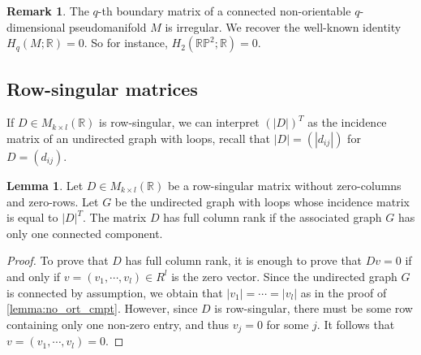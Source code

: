 \documentclass{article}
\theoremstyle{definition}
\newtheorem{remark}[theorem]{Remark}
\newtheorem{lemma}[theorem]{Lemma}
\begin{document}
\begin{remark}
    The $q$-th boundary matrix of a connected non-orientable $q$-dimensional pseudomanifold $M$ is irregular. We recover the well-known identity $H_q(M; \mathbb{R}) = 0$. So for instance, $H_2(\mathbb{RP}^2;\mathbb{R}) = 0.$
\end{remark}

\subsection{Row-singular matrices}\label{subsec:singular_mtx}
If $D \in M_{k \times l}(\mathbb{R})$ is row-singular, 
we can interpret $(|D|)^T$ as the incidence matrix of an undirected graph with loops,
recall that $|D|=(|d_{ij}|)$ for $D=(d_{ij})$.










\begin{lemma}\label{lemma:sig_cmpt}
Let $D\in M_{k\times l}(\mathbb{R})$ be a row-singular matrix without zero-columns and zero-rows.
Let $G$ be the undirected graph with loops whose incidence matrix is equal to $|D|^T$.
The matrix $D$ has full column rank if the associated graph $G$ has only one connected component.
\end{lemma}

\begin{proof}
To prove that $D$ has full column rank,
it is enough to prove that $Dv=0$ if and only if $v=(v_1,\cdots, v_l)\in R^l$ is the zero vector.
Since the undirected graph $G$ is connected by assumption,
we obtain that 
 $|v_1|=\cdots=|v_l|$ as in the proof of \cref{lemma:no_ort_cmpt}.
However,
since $D$ is row-singular,
there must be some row containing only one non-zero entry, and thus $v_j=0$ for some $j$. It follows that $v=(v_1,\cdots, v_l)=0$.
\end{proof}
\end{document}
